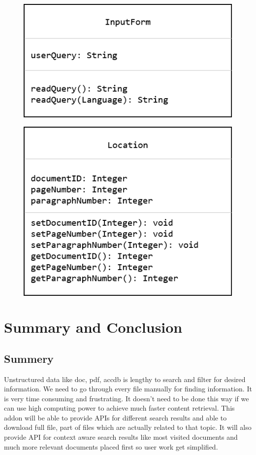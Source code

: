 \documentclass[oneside,a4paper,12pt]{report}
\begin{document}
{\begin{figure}[H]
\includegraphics{class_input_form}
\end{figure}

\begin{figure}[H]
\includegraphics{class_location}
\end{figure}

 
 \chapter{Summary and Conclusion}
\section{Summery}
Unstructured data like doc, pdf, accdb is lengthy to search and filter for desired information. We need to go through every file manually for finding information. It is very time consuming and frustrating. It doesn’t need to be done this way if we can use high computing power to achieve much faster content retrieval. This addon will be able to provide APIs for different search results and able to download full file, part of files which are actually related to that topic. It will also provide API for context aware search results like most visited documents and much more relevant documents placed first so user work get simplified.    

}
\end{document}
